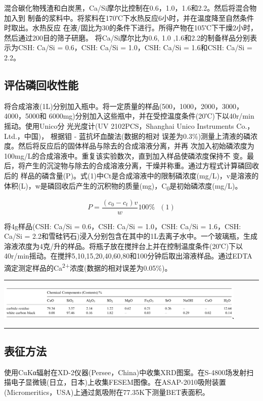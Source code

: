 \documentclass[11pt]{article}
\begin{document}
混合碳化物残渣和白炭黑，Ca/Si摩尔比控制在0.6，1.0，1.6和2.2。然后将混合物加入到
制备的浆料中。将浆料在170℃下水热反应6小时，并在温度降至自然条件时取出。水热反应
在液/固比为30的条件下进行。所得产物在105℃下干燥2小时，然后通过200目的筛子研磨。
将Ca/Si摩尔比为0.6, 1.0 ,1.6和2.2的制备样品分别表示为CSH: Ca/Si = 0.6，CSH: Ca/Si
= 1.0，CSH: Ca/Si = 1.6和CSH: Ca/Si = 2.2。
\subsection{评估磷回收性能}
\label{sec:org29c3860}
将合成溶液(1L)分别加入瓶中。将一定质量的样品(500，1000，2000，3000，4000，5000和
6000mg)分别加入这些瓶中，并在受控温度条件(20℃)下以40r/min摇动。使用Unico分
光光度计(UV 2102PCS，Shanghai Unico Instruments Co.，Ltd.，中国)，
\cite{gustafsson08_phosp_remov_by_miner_based} 根据钼 - 蓝抗坏血酸法(数据的相对
误差为0.3\%)测量上清液的磷浓度。然后将反应后的固体样品与除去的合成溶液分离，并再
次加入初始磷浓度为100mg/L的合成溶液中。重复该实验数次，直到加入样品使磷浓度保持不
变。最后，将产生的沉淀物与除去的合成溶液分离，干燥并称重。通过方程式计算磷回收后的
样品的磷含量(P)。式(1)中Ct是合成溶液中的限制磷浓度(mg/L)，v是溶液的体积(L)，w是磷回收后产生的沉积物的质量(mg)，C\textsubscript{0}是初始磷浓度(mg/L)。

\[P = \frac{(c_{0} - c_{t})v}{w} 100\% \ \ \  (1)\]

将4g样品(CSH: Ca/Si = 0.6，CSH: Ca/Si = 1.0，CSH: Ca/Si = 1.6，CSH: Ca/Si = 2.2和雪硅钙石)浸入分别包含在其中的1L去离子水中。一个玻璃瓶，生成溶液浓度为4克/升的样品。将瓶子放在搅拌台上并在控制温度条件(20℃)下以40r/min摇动。在搅拌5,10,15,20,40,60,80和100分钟后取出溶液样品。通过EDTA滴定测定样品的Ca\textsuperscript{2+}浓度(数据的相对误差为0.05\%)。\cite{kim03_effec_ph_sulfat_sodium_edta_titrat_calcium}

\noindent\rule{\textwidth}{0.5pt}

\includegraphics[width=0.9\textwidth]{table.1.new.png}
 \label{tab:title}

\noindent\rule{\textwidth}{0.5pt}

\subsection{表征方法}
\label{sec:org0978821}
\setlength{\parindent}{1.0cm}
使用CuKα辐射在XD-2仪器(Persee，China)中收集XRD图案。在S-4800场发射扫描电子显微镜(日立，日本)上收集FESEM图像。在ASAP-2010吸附装置(Micromeritics，USA)上通过氮吸附在77.35K下测量BET表面积。
\par
\end{document}
